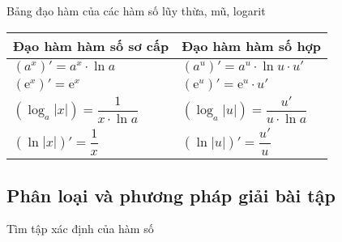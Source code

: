 Bảng đạo hàm của các hàm số lũy thừa, mũ, logarit
\begin{center}
	\begin{tabular}{|l|l|}
		\hline 
		Đạo hàm hàm số sơ cấp & Đạo hàm hàm số hợp\\ 
		\hline 
		$\left(a^x\right)'=a^x\cdot \ln a$ & $\left(a^u\right)'=a^u\cdot \ln u \cdot u'$\\ 
		\hline 
		$\left(\mathrm{e}^x\right)'=\mathrm{e}^x$ & $\left(\mathrm{e}^u\right)'=\mathrm{e}^u \cdot u'$\\
		\hline
		$\left(\log_a{|x|}\right)=\dfrac{1}{x\cdot \ln a}$ & $\left(\log_a{|u|}\right)=\dfrac{u'}{u\cdot \ln a}$\\
		\hline
		$\left(\ln |x|\right)'=\dfrac{1}{x}$ & $\left(\ln |u|\right)'=\dfrac{u'}{u}$\\
		\hline
	\end{tabular}
\end{center}

\subsection{Phân loại và phương pháp giải bài tập}
\begin{dang}{Tìm tập xác định của hàm số}
\end{dang}
